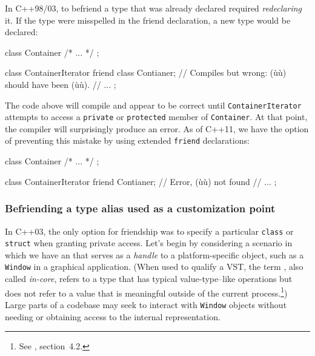 In C++98/03, to befriend a type that was already declared required
\emph{redeclaring} it. If the type were misspelled in the friend
declaration, a new type would be declared:

\begin{emcppslisting}
class Container { /* ... */ };

class ContainerIterator
{
    friend class Contianer;  // Compiles but wrong: (ù{}ù) should have been (ù{}ù).
    // ...
};
\end{emcppslisting}
    
\noindent The code above will compile and appear to be correct until
\lstinline!ContainerIterator! attempts to access a \lstinline!private! or
\lstinline!protected! member of \lstinline!Container!. At that point, the
compiler will surprisingly produce an error. As of C++11, we have the
option of preventing this mistake by using extended \lstinline!friend!
declarations:

\begin{emcppslisting}
class Container { /* ... */ };

class ContainerIterator
{
    friend Contianer;  // Error, (ù{}ù) not found
    // ...
};
\end{emcppslisting}
    

\subsubsection[Befriending a type alias used as a customization point]{Befriending a type alias used as a customization point}\label{befriending-a-type-alias-used-as-a-customization-point}

In C++03, the only option for friendship was to specify a particular
\lstinline!class! or \lstinline!struct! when granting private access. Let's
begin by considering a scenario in which we have an
 
that serves as a \emph{handle} to a platform-specific object, such as a
\lstinline!Window! in a graphical application. (When used to qualify a VST, the
term , also called \emph{in-core}, refers to a type
that has typical value-type--like operations but does not refer to a
value that is meaningful outside of the current process.\footnote{See
  \cite{lakos2a}, section~4.2.}) Large parts of a codebase
may seek to interact with \lstinline!Window! objects without needing or
obtaining access to the internal representation.

